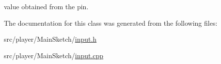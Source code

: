 value obtained from the pin. 



The documentation for this class was generated from the following files\-:\begin{DoxyCompactItemize}
\item 
src/player/\-Main\-Sketch/\hyperlink{MainSketch_2input_8h}{input.\-h}\item 
src/player/\-Main\-Sketch/\hyperlink{MainSketch_2input_8cpp}{input.\-cpp}\end{DoxyCompactItemize}
